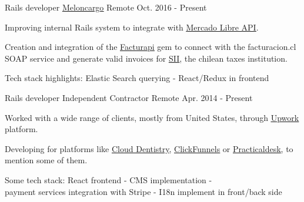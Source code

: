 
\begin{cventries}

  \cventry
    {Rails developer} %
    {\href{http://www.meloncargo.com/}{\underline{Meloncargo}}} %
    {Remote} %
    {Oct. 2016 - Present} %
    {
      \begin{cvitems} %
        \item { Improving internal Rails system to integrate with
                \href{http://developers.mercadolibre.com/}{\underline{Mercado Libre API}}.}
        \item { Creation and integration of the
                \href{https://github.com/meloncargo/facturapi}{\underline{Facturapi}}
                gem to connect with the facturacion.cl SOAP service and generate
                valid invoices for \href{http://www.sii.cl}{\underline{SII}},
                the chilean taxes institution.}
        \item { Tech stack highlights: Elastic Search querying - React/Redux in frontend }
      \end{cvitems}
    }

  \cventry
    {Rails developer} %
    {Independent Contractor} %
    {Remote} %
    {Apr. 2014 - Present} %
    {
      \begin{cvitems} %
        \item { Worked with a wide range of clients, mostly from United States, through
                \href{https://www.upwork.com/freelancers/~0165692cc0b947512e}{\underline{Upwork}} platform.}
        \item { Developing for platforms like
                \href{https://www.clouddentistry.com/}{\underline{Cloud Dentistry}},
                \href{https://www.clickfunnels.com/}{\underline{ClickFunnels}} or
                \href{https://practicaldesk.com/}{\underline{Practicaldesk}},
                to mention some of them.}
        \item { Some tech stack: React frontend - CMS implementation - \\
                payment services integration with Stripe - I18n implement in front/back side}
      \end{cvitems}
    }


\end{cventries}
